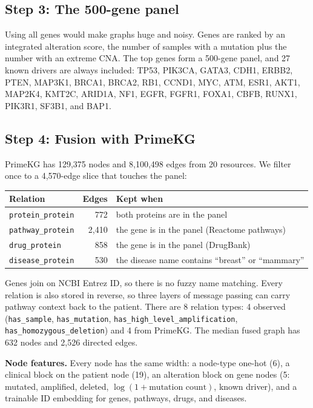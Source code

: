 \documentclass[11pt,a4paper]{article}
\begin{document}
\subsection{Step 3: The 500-gene panel}
Using all genes would make graphs huge and noisy. Genes are ranked by an integrated alteration score, the number of samples with a mutation plus the number with an extreme CNA. The top genes form a 500-gene panel, and 27 known drivers are always included: TP53, PIK3CA, GATA3, CDH1, ERBB2, PTEN, MAP3K1, BRCA1, BRCA2, RB1, CCND1, MYC, ATM, ESR1, AKT1, MAP2K4, KMT2C, ARID1A, NF1, EGFR, FGFR1, FOXA1, CBFB, RUNX1, PIK3R1, SF3B1, and BAP1.

\subsection{Step 4: Fusion with PrimeKG}
PrimeKG has 129,375 nodes and 8,100,498 edges from 20 resources. We filter once to a 4,570-edge slice that touches the panel:
\begin{center}
\begin{tabular}{lrp{8cm}}
\toprule
Relation & Edges & Kept when \\
\midrule
\texttt{protein\_protein} & 772 & both proteins are in the panel \\
\texttt{pathway\_protein} & 2,410 & the gene is in the panel (Reactome pathways) \\
\texttt{drug\_protein} & 858 & the gene is in the panel (DrugBank) \\
\texttt{disease\_protein} & 530 & the disease name contains ``breast'' or ``mammary'' \\
\bottomrule
\end{tabular}
\end{center}
Genes join on NCBI Entrez ID, so there is no fuzzy name matching. Every relation is also stored in reverse, so three layers of message passing can carry pathway context back to the patient. There are 8 relation types: 4 observed (\texttt{has\_sample}, \texttt{has\_mutation}, \texttt{has\_high\_level\_amplification}, \texttt{has\_homozygous\_deletion}) and 4 from PrimeKG. The median fused graph has 632 nodes and 2,526 directed edges.

\textbf{Node features.} Every node has the same width: a node-type one-hot (6), a clinical block on the patient node (19), an alteration block on gene nodes (5: mutated, amplified, deleted, $\log(1+\text{mutation count})$, known driver), and a trainable ID embedding for genes, pathways, drugs, and diseases.
\end{document}
